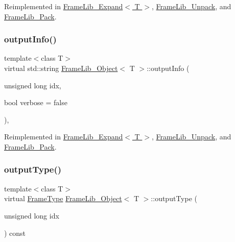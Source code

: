 Reimplemented in \hyperlink{class_frame_lib___expand_ac4527eab2bfb55a38bd796d95f2a2562}{Frame\+Lib\+\_\+\+Expand$<$ T $>$}, \hyperlink{class_frame_lib___unpack_ab298a6feb7c051f3563a01caacd99c02}{Frame\+Lib\+\_\+\+Unpack}, and \hyperlink{class_frame_lib___pack_aa15c5f54847d99c3bd3f9c2cf7688fd2}{Frame\+Lib\+\_\+\+Pack}.

\mbox{\label{class_frame_lib___object_a6e6d79e8d620eedbaa50abf324cdedf5}} 
\subsubsection{\texorpdfstring{output\+Info()}{outputInfo()}}
{\footnotesize\ttfamily template$<$class T$>$ \\
virtual std\+::string \hyperlink{class_frame_lib___object}{Frame\+Lib\+\_\+\+Object}$<$ T $>$\+::output\+Info (\begin{DoxyParamCaption}\item[{unsigned long}]{idx,  }\item[{bool}]{verbose = {\ttfamily false} }\end{DoxyParamCaption})\hspace{0.3cm}{\ttfamily [inline]}, {\ttfamily [virtual]}}



Reimplemented in \hyperlink{class_frame_lib___expand_abba12bed97c0b76095f1e1a699591b3e}{Frame\+Lib\+\_\+\+Expand$<$ T $>$}, \hyperlink{class_frame_lib___unpack_a7e9a710850c3d94d73d00ea27a90d494}{Frame\+Lib\+\_\+\+Unpack}, and \hyperlink{class_frame_lib___pack_a40e71debefbc3e5e507e4f494e9efd68}{Frame\+Lib\+\_\+\+Pack}.

\mbox{\label{class_frame_lib___object_a03eb408844f15d8f73cee67f43149b9d}} 
\subsubsection{\texorpdfstring{output\+Type()}{outputType()}}
{\footnotesize\ttfamily template$<$class T$>$ \\
virtual \hyperlink{_frame_lib___types_8h_ad495a9f61af7fff07d7e97979d1ab854}{Frame\+Type} \hyperlink{class_frame_lib___object}{Frame\+Lib\+\_\+\+Object}$<$ T $>$\+::output\+Type (\begin{DoxyParamCaption}\item[{unsigned long}]{idx }\end{DoxyParamCaption}) const\hspace{0.3cm}{\ttfamily [pure virtual]}}



